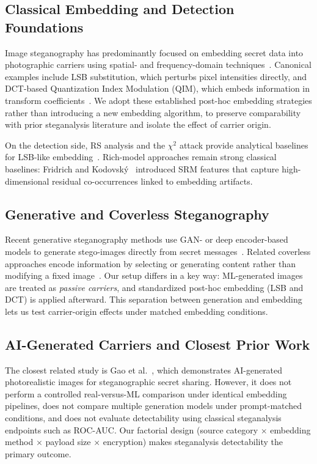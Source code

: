 \documentclass[10pt,twocolumn,a4paper]{article}
\begin{document}
\subsection{Classical Embedding and Detection Foundations}
Image steganography has predominantly focused on embedding secret data into photographic carriers using spatial- and frequency-domain techniques~\cite{petitcolas1999,cheddad2010,hussain2018}. Canonical examples include LSB substitution, which perturbs pixel intensities directly, and DCT-based Quantization Index Modulation (QIM), which embeds information in transform coefficients~\cite{chen_wornell2001}. We adopt these established post-hoc embedding strategies rather than introducing a new embedding algorithm, to preserve comparability with prior steganalysis literature and isolate the effect of carrier origin.

On the detection side, RS analysis and the $\chi^2$ attack provide analytical baselines for LSB-like embedding~\cite{fridrich2001lsb,westfeld1999chi}. Rich-model approaches remain strong classical baselines: Fridrich and Kodovsk\'{y}~\cite{fridrich2012srm} introduced SRM features that capture high-dimensional residual co-occurrences linked to embedding artifacts.

\subsection{Generative and Coverless Steganography}
Recent generative steganography methods use GAN- or deep encoder-based models to generate stego-images directly from secret messages~\cite{tang2017cnn,zhu2018hidden}. Related coverless approaches encode information by selecting or generating content rather than modifying a fixed image~\cite{duan2020}. Our setup differs in a key way: ML-generated images are treated as \emph{passive carriers}, and standardized post-hoc embedding (LSB and DCT) is applied afterward. This separation between generation and embedding lets us test carrier-origin effects under matched embedding conditions.

\subsection{AI-Generated Carriers and Closest Prior Work}
The closest related study is Gao et al.~\cite{gao2022ai}, which demonstrates AI-generated photorealistic images for steganographic secret sharing. However, it does not perform a controlled real-versus-ML comparison under identical embedding pipelines, does not compare multiple generation models under prompt-matched conditions, and does not evaluate detectability using classical steganalysis endpoints such as ROC-AUC. Our factorial design (source category $\times$ embedding method $\times$ payload size $\times$ encryption) makes steganalysis detectability the primary outcome.
\end{document}
